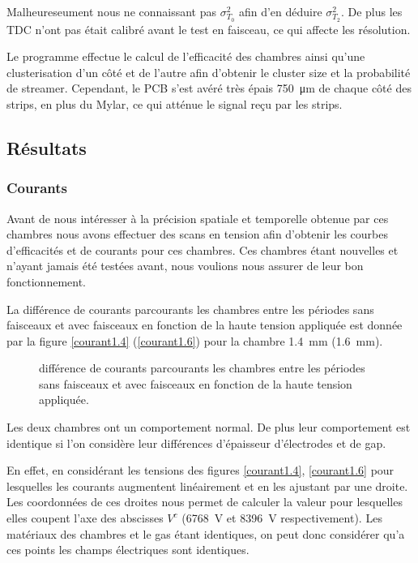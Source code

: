 Malheureseument nous ne connaissant pas $\sigma_{T_0}^2$ afin d'en déduire $\sigma_{T_2}^2$. De plus les TDC n'ont pas était calibré avant le test en faisceau, ce qui affecte les résolution.

Le programme effectue le calcul de l'efficacité des chambres ainsi  qu'une clusterisation d'un côté et de l'autre afin d'obtenir le cluster size et la probabilité de streamer. Cependant, le PCB s'est avéré très épais \SI{750}{\micro\meter} de chaque côté des strips, en plus du Mylar, ce qui atténue le signal reçu par les strips.

\subsection{Résultats}


\subsubsection{Courants}
Avant de nous intéresser à la précision spatiale et temporelle obtenue par ces chambres nous avons effectuer des scans en tension afin d'obtenir les courbes d'efficacités et de courants pour ces chambres. Ces chambres étant nouvelles et n'ayant jamais été testées avant, nous voulions nous assurer de leur bon fonctionnement.

La différence de courants parcourants les chambres entre les périodes sans faisceaux et avec faisceaux en fonction de la haute tension appliquée est donnée par la figure \ref{courant1.4} (\ref{courant1.6}) pour la chambre \SI{1.4}{\milli\meter} (\SI{1.6}{\milli\meter}).

\begin{figure}[ht!]
	\vspace{-0.5cm}
	\centering
	\caption{différence de courants parcourants les chambres entre les périodes sans faisceaux et avec faisceaux en fonction de la haute tension appliquée.}
	\label{courant1.41.6}
\end{figure}

Les deux chambres ont un comportement normal. De plus leur comportement est identique si l'on considère leur différences d'épaisseur d'électrodes et de gap.

En effet, en considérant les tensions des figures \ref{courant1.4}, \ref{courant1.6} pour lesquelles les courants augmentent linéairement et en les ajustant par une droite. Les coordonnées de ces droites nous permet de calculer la valeur pour lesquelles elles coupent l'axe des abscisses $V^c$ (\SI{6768}{\volt} et \SI{8396}{\volt} respectivement). Les matériaux des chambres et le gas étant identiques, on peut donc considérer qu'a ces points les champs électriques sont identiques.

